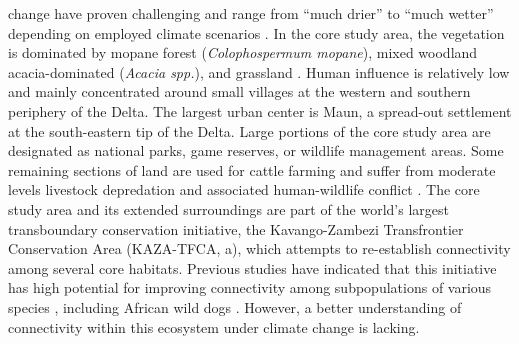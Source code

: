 \documentclass[../FinalThesis.tex]{subfiles}
\begin{document}
change have proven challenging and range from ``much drier'' to ``much wetter''
depending on employed climate scenarios \citep{Kgathi.2006, Wolski.2008,
Hughes.2011, Wolski.2012, Moses.2018}. In the core study area, the vegetation is
dominated by mopane forest (\textit{Colophospermum mopane}), mixed woodland
acacia-dominated (\textit{Acacia spp.}), and grassland \citep{Mendelsohn.2010}.
Human influence is relatively low and mainly concentrated around small villages
at the western and southern periphery of the Delta. The largest urban center is
Maun, a spread-out settlement at the south-eastern tip of the Delta. Large
portions of the core study area are designated as national parks, game reserves,
or wildlife management areas. Some remaining sections of land are used for
cattle farming and suffer from moderate levels livestock depredation and
associated human-wildlife conflict \citep{Gusset.2009, McNutt.2017}. The core
study area and its extended surroundings are part of the world's largest
transboundary conservation initiative, the Kavango-Zambezi Transfrontier
Conservation Area (KAZA-TFCA, a), which attempts to
re-establish connectivity among several core habitats. Previous studies have
indicated that this initiative has high potential for improving connectivity
among subpopulations of various species \citep{Brennan.2020, Lines.2021},
including African wild dogs \citep{Hofmann.2021}. However, a better
understanding of connectivity within this ecosystem under climate change is
lacking.
\end{document}
